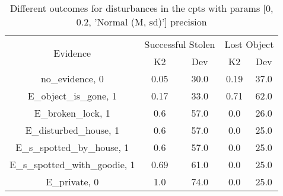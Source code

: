 \begin{table}\begin{tabular}{c|cc|cc}\toprule\multirow{2}{*}{Evidence} & \multicolumn{2}{c}{Successful Stolen} & \multicolumn{2}{c}{Lost Object} \\& {K2} & {Dev} & {K2} & {Dev} \\\midrule
no\_evidence, 0 & \cellcolor{Bittersweet}0.05&\cellcolor{Bittersweet}30.0&\cellcolor{Bittersweet}0.19&\cellcolor{Bittersweet}37.0\\E\_object\_is\_gone, 1 & \cellcolor{Bittersweet}0.17&\cellcolor{Bittersweet}33.0&\cellcolor{Bittersweet}0.71&\cellcolor{Bittersweet}62.0\\E\_broken\_lock, 1 & 0.6&57.0&\cellcolor{Bittersweet}0.0&\cellcolor{Bittersweet}26.0\\E\_disturbed\_house, 1 & 0.6&57.0&\cellcolor{Bittersweet}0.0&\cellcolor{Bittersweet}25.0\\E\_s\_spotted\_by\_house, 1 & 0.6&57.0&\cellcolor{Bittersweet}0.0&\cellcolor{Bittersweet}25.0\\E\_s\_spotted\_with\_goodie, 1 & \cellcolor{Bittersweet}0.69&\cellcolor{Bittersweet}61.0&\cellcolor{Bittersweet}0.0&\cellcolor{Bittersweet}25.0\\E\_private, 0 & \cellcolor{Bittersweet}1.0&\cellcolor{Bittersweet}74.0&\cellcolor{Bittersweet}0.0&\cellcolor{Bittersweet}25.0\\\bottomrule\end{tabular}\caption{Different outcomes for disturbances in the cpts with params [0, 0.2, 'Normal (M, sd)'] precision}\end{table}